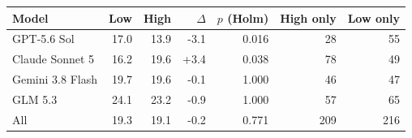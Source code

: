 \begin{tabular}{l rrr rrr}
\toprule
Model & Low & High & $\Delta$ & $p$ (Holm) & High only & Low only \\
\midrule
GPT-5.6 Sol & 17.0 & 13.9 & -3.1 & 0.016 & 28 & 55 \\
Claude Sonnet 5 & 16.2 & 19.6 & +3.4 & 0.038 & 78 & 49 \\
Gemini 3.8 Flash & 19.7 & 19.6 & -0.1 & 1.000 & 46 & 47 \\
GLM 5.3 & 24.1 & 23.2 & -0.9 & 1.000 & 57 & 65 \\
\midrule
All & 19.3 & 19.1 & -0.2 & 0.771 & 209 & 216 \\
\bottomrule
\end{tabular}